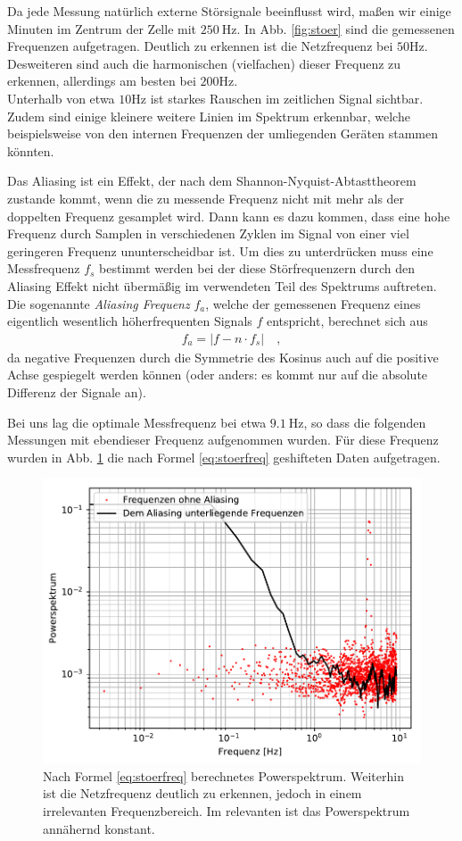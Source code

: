 \documentclass[12pt,a4paper,titlepage,headinclude]{scrartcl}
\numberwithin{equation}{subsection}
\begin{document}
Da jede Messung natürlich externe Störsignale beeinflusst wird, maßen wir einige Minuten im Zentrum der Zelle mit $\SI{250}\hertz$.
In Abb. \ref{fig:stoer} sind die gemessenen Frequenzen aufgetragen.
Deutlich zu erkennen ist die Netzfrequenz bei $50\si{\hertz}$.
Desweiteren sind auch die harmonischen (vielfachen) dieser Frequenz zu erkennen, allerdings am besten bei $200\si{\hertz}$.\\
Unterhalb von etwa $10\si{\hertz}$ ist starkes Rauschen im zeitlichen Signal sichtbar.
Zudem sind einige kleinere weitere Linien im Spektrum erkennbar, welche beispielsweise von den internen Frequenzen der umliegenden Geräten stammen könnten.

Das Aliasing ist ein Effekt, der nach dem Shannon-Nyquist-Abtasttheorem zustande kommt, wenn die zu messende Frequenz nicht mit mehr als der doppelten Frequenz gesamplet wird.
Dann kann es dazu kommen, dass eine hohe Frequenz durch Samplen in verschiedenen Zyklen im Signal von einer viel geringeren Frequenz ununterscheidbar ist.
Um dies zu unterdrücken muss eine Messfrequenz $f_s$ bestimmt werden bei der diese Störfrequenzern durch den Aliasing Effekt nicht übermäßig im verwendeten Teil des Spektrums auftreten.
Die sogenannte \textit{Aliasing Frequenz} $f_a$, welche der gemessenen Frequenz eines eigentlich wesentlich höherfrequenten Signals $f$ entspricht, berechnet sich aus
\begin{align}
  f_a=|f-n\cdot f_s|\quad,
  \label{eq:stoerfreq}
\end{align}
da negative Frequenzen durch die Symmetrie des Kosinus auch auf die positive Achse gespiegelt werden können (oder anders: es kommt nur auf die absolute Differenz der Signale an).

Bei uns lag die optimale Messfrequenz bei etwa $\SI{9.1}\hertz$, so dass die folgenden Messungen mit ebendieser Frequenz aufgenommen wurden.
Für diese Frequenz wurden in Abb. \ref{fig:stoershift} die nach Formel \ref{eq:stoerfreq} geshifteten Daten aufgetragen.

\begin{figure}[h]
	\centering
	\includegraphics[width=0.6\linewidth]{stoer_shift}
	\caption{Nach Formel \ref{eq:stoerfreq} berechnetes Powerspektrum. Weiterhin ist die Netzfrequenz deutlich zu erkennen, jedoch in einem irrelevanten Frequenzbereich. Im relevanten ist das Powerspektrum annähernd konstant.}
	\label{fig:stoershift}
\end{figure}
\end{document}
